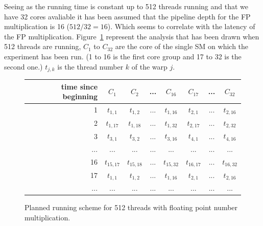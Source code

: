 \documentclass{article}
\begin{document}
    Seeing as the running time is constant up to 512 threads running and that we have 32 cores avaliable it has been assumed that the pipeline depth for the FP multiplication is 16 ($512/32 = 16$). Which seems to correlate with the latency of the FP multiplication.
    Figure~\ref{fig:fp_prediction_512} represent the analysis that has been drawn when 512 threads are running, $C_1$ to $C_{32}$ are the core of the single SM on which the experiment has been run. (1 to 16 is the first core group and 17 to 32 is the second one.) $t_{j,k}$ is the thread number $k$ of the warp $j$. 
        \begin{figure}[h]
      \centering
       \begin{tabular}{ | r || c | c | c | c || c | c | c | }
    	    \hline
    	    time since beginning & $C_1$ & $C_2$ & ... & $C_{16}$ & $C_{17}$ & ... & $C_{32}$ \\ \hline  \hline
    	   1 & $t_{1,1}$ & $t_{1,2}$ & ... & $t_{1,16}$ & $t_{2, 1}$ & ... & $t_{2, 16}$ \\ \hline 
    	   2 & $t_{1,17}$ & $t_{1,18}$ & ... & $t_{1,32}$ & $t_{2, 17}$ & ... & $t_{2, 32}$ \\ \hline
    	   3 & $t_{3,1}$ & $t_{3,2}$ & ... & $t_{3,16}$ & $t_{4, 1}$ & ... & $t_{4, 16}$ \\ \hline
    	   ... & ... & ... & ... & ... & ... & ... & ... \\ \hline
    	   16 & $t_{15,17}$ & $t_{15,18}$ & ... & $t_{15,32}$ & $t_{16,17}$ & ... & $t_{16, 32}$ \\ \hline
    	   17 & $t_{1,1}$ & $t_{1,2}$ & ... & $t_{1,16}$ & $t_{2, 1}$ & ... & $t_{2, 16}$ \\ \hline
    	   ... & ... & ... & ... & ... & ... & ... & ... \\ \hline
  	\end{tabular}
  	\captionsetup{justification=centering}
  	\caption{Planned running scheme for 512 threads with floating point number multiplication.}
  	\label{fig:fp_prediction_512}
   \end{figure}
   
\end{document}
